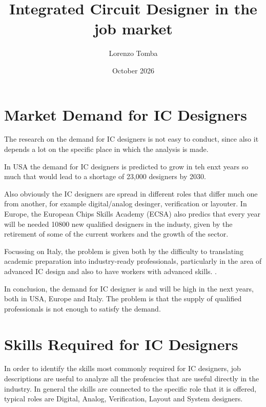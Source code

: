 \documentclass[twocolumn]{article}
\title{
    \vspace{-1cm}
    \vspace{0.5cm}
    \textbf{Integrated Circuit Designer in the job market}\\
}
\author{
    {Lorenzo Tomba}
}
\date{October 2026}
\begin{document}
\maketitle


\section{Market Demand for IC Designers}

The research on the demand for IC designers is not easy to conduct, since also it depends a lot on the specific place in which the analysis is made.

In USA the demand for IC designers is predicted to grow in teh enxt years so much that would lead to a shortage of 23,000 designers by 2030. \cite{bcg_semiconductor_design}

Also obviously the IC designers are spread in different roles that differ much one from another, for example digital/analog desinger, verification or layouter. \cite{sia_chip_design}
In Europe, the European Chips Skills Academy (ECSA) also predics that every year will be needed 10800 new qualified designers in the industy, given by the retirement of some of the current workers and the growth of the sector. \cite{ecsa_skills_2025}

Focussing on Italy, the problem is given both by the difficulty to translating academic preparation into industry-ready professionals, particularly in the area of advanced IC design and also to have workers with advanced skills. \cite{chipsit_strategic_plan}.

In conclusion, the demand for IC designer is and will be high in the next years, both in USA, Europe and Italy. The problem is that the supply of qualified professionals is not enough to satisfy the demand.

\section{Skills Required for IC Designers}

In order to identify the skills most commonly required for IC designers, job descriptions are useful to analyze all the profencies that are useful directly in the industry. In general the skills are connected to the specific role that it is offered, typical roles are Digital, Analog, Verification, Layout and System designers.
\end{document}

